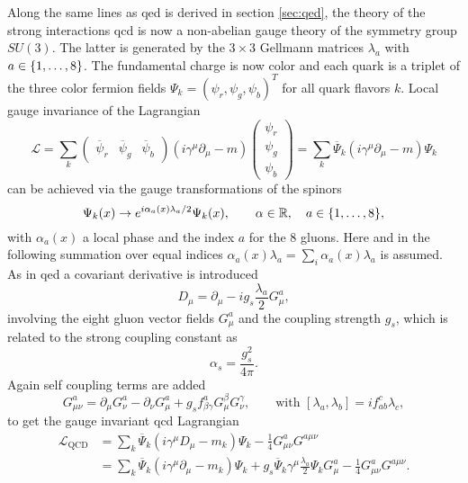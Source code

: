 Along the same lines as \ac{qed} is derived in section \ref{sec:qed}, the theory of the strong interactions \ac{qcd} is now a non-abelian gauge theory of the symmetry group $SU(3)$. The latter is generated by the $3\times 3$ Gellmann matrices $\lambda_a$ with $ a\in\{1,\mathellipsis,8\}$. The fundamental charge is now color and each quark is a triplet of the three color fermion fields $\Psi_k=(\psi_r,\psi_g,\psi_b)^T$ for all quark flavors $k$. Local gauge invariance of the Lagrangian
\begin{equation}
    \mathcal{L} =
    \sum_k
    \begin{pmatrix}
        \overline{\psi}_r & \overline{\psi}_g & \overline{\psi}_b
    \end{pmatrix}
    (i \gamma^\mu \partial_\mu - m )
    \begin{pmatrix}
        \psi_r \\
        \psi_g \\
        \psi_b
    \end{pmatrix}
    =
    \sum_k
    \overline{\Psi}_k(i \gamma^\mu \partial_\mu - m )\Psi_k
    \label{eq:dirac}
\end{equation}
can be achieved via the gauge transformations of the spinors
\begin{equation}
    \Psi_k(x) \rightarrow e^{i \alpha_a(x) \lambda_a/2} \Psi_k(x),\qquad \alpha\in\mathbb{R},\quad a\in\{1,\mathellipsis,8\},
\end{equation}
with $\alpha_a(x)$ a local phase and the index $a$ for the 8 gluons. Here and in the following  summation over equal indices $\alpha_a(x) \lambda_a=\sum_i \alpha_a(x) \lambda_a$ is assumed. As in \ac{qed} a covariant derivative is introduced
\begin{equation}
    D_\mu = \partial_\mu - i g_s \frac{\lambda_a}{2}G_\mu^a,
\end{equation}
involving the eight gluon vector fields $G_\mu^a$ and the coupling strength $g_s$, which is related to the strong coupling constant as
\begin{equation}
    \alpha_s=\frac{g_s^2}{4\pi}.
\end{equation}
Again self coupling terms are added
\begin{equation}
    G^a_{\mu\nu}=\partial_\mu G_\nu^a-\partial_\nu G_\mu^a+g_s f^a_{\beta\gamma}G^\beta_\mu G_\nu^\gamma, \qquad \text{with } [\lambda_a,\lambda_b]= i f_{ab}^c \lambda_c,
\end{equation}
to get the gauge invariant \ac{qcd} Lagrangian
\begin{align}
    {\mathcal {L}}_{\text{QCD}} & =\sum_k\overline{\Psi}_k\left( i \gamma^\mu D_\mu-m_k\right)\Psi_k-{\frac {1}{4}}G_{\mu \nu }^{a}G^{a\mu \nu}                                                                                    \\
                                & =\sum_k{\overline{\Psi}_k}\left(i\gamma^\mu \partial_\mu-m_k\right)\Psi_k+ g_s{\overline{\Psi}_k}\gamma ^{\mu }\frac{ \lambda_a}{2} \Psi_k G_\mu^a - {\frac {1}{4}}G_{\mu \nu }^{a}G^{a\mu \nu}.
    \label{eq:l_qcd}
\end{align}
